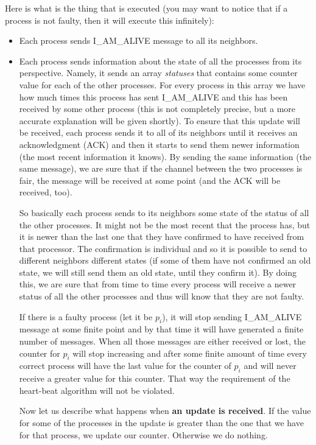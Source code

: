 \documentclass[12pt]{article}
\theoremstyle{plain}
\begin{document}
Here is what is the thing that is executed (you may want to notice that if a 
process is not faulty, then it will execute this infinitely):
\begin{itemize}
  \item Each process sends I\_AM\_ALIVE message to all its neighbors.
  \item Each process sends information about the state of all the processes 
    from its perspective. Namely, it sends an array \emph{statuses} that contains
    some counter value for each of the other processes. For every process in
    this array we have how much times this process has sent I\_AM\_ALIVE and
    this has been received by some other process (this is not completely
    precise, but a more accurate explanation will be given shortly). To ensure
    that this update will be received, each process sends it to all of its 
    neighbors until it receives an acknowledgment (ACK) and then it starts to
    send them newer information (the most recent information it knows). By
    sending the same information (the same message), we are sure that if the
    channel between the two processes is fair, the message will be received
    at some point (and the ACK will be received, too).

    So basically each process sends to its neighbors some state of the status
    of all the other processes. It might not be the most recent that the process
    has, but it is newer than the last one that they have confirmed to have
    received from that processor. The confirmation is individual and so it is
    possible to send to different neighbors different states (if some of them 
    have not confirmed an old state, we will still send them an old state,
    until they confirm it). By doing this, we are sure that from time to time
    every process will receive a newer status of all the other processes and
    thus will know that they are not faulty. 

    If there is a faulty process (let it be $p_i$), it will stop sending
    I\_AM\_ALIVE message at some finite point and by that time it will have
    generated a finite number of messages. When all those messages are either
    received or lost, the counter for $p_i$ will stop increasing and after 
    some finite amount of time every correct process will have the last value
    for the counter of $p_i$ and will never receive a greater value for this
    counter. That way the requirement of the heart-beat algorithm will not be
    violated.

    Now let us describe what happens when \textbf{an update is received}. If the
    value for some of the processes in the update is greater than the one that
    we have for that process, we update our counter. Otherwise we do nothing.


\end{itemize}
\end{document}
